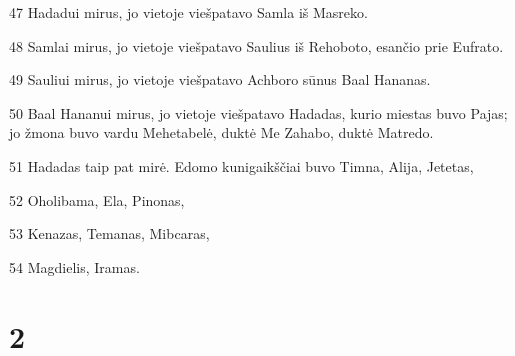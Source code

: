 \par 47 Hadadui mirus, jo vietoje viešpatavo Samla iš Masreko. 
\par 48 Samlai mirus, jo vietoje viešpatavo Saulius iš Rehoboto, esančio prie Eufrato. 
\par 49 Sauliui mirus, jo vietoje viešpatavo Achboro sūnus Baal Hananas. 
\par 50 Baal Hananui mirus, jo vietoje viešpatavo Hadadas, kurio miestas buvo Pajas; jo žmona buvo vardu Mehetabelė, duktė Me Zahabo, duktė Matredo. 
\par 51 Hadadas taip pat mirė. Edomo kunigaikščiai buvo Timna, Alija, Jetetas, 
\par 52 Oholibama, Ela, Pinonas, 
\par 53 Kenazas, Temanas, Mibcaras, 
\par 54 Magdielis, Iramas.


\chapter{2}

